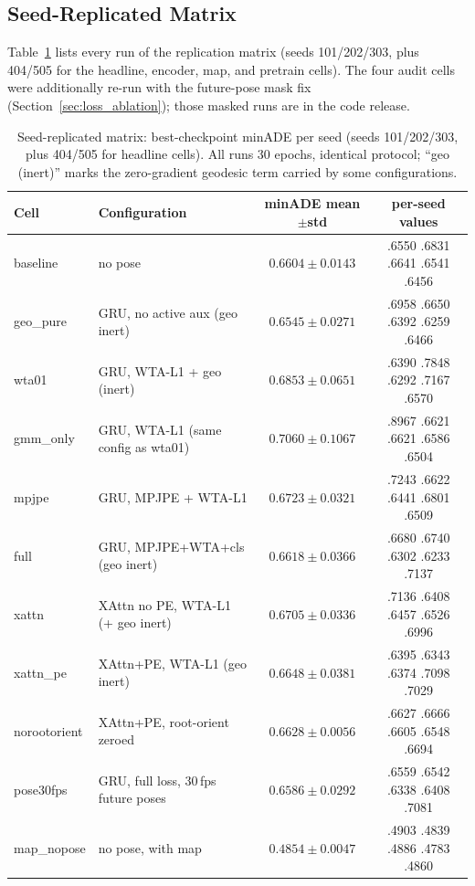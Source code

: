 \documentclass{article} %
\newcommand{\minADE}{minADE\xspace}
\begin{document}
\subsection{Seed-Replicated Matrix}
Table~\ref{tab:multiseed} lists every run of the replication matrix
(seeds 101/202/303, plus 404/505 for the headline, encoder, map, and pretrain
cells). The four audit cells were additionally re-run with the future-pose mask fix
(Section~\ref{sec:loss_ablation}); those masked runs are in the code release.

\begin{table}[h]
\caption{Seed-replicated matrix: best-checkpoint \minADE per seed (seeds
101/202/303, plus 404/505 for headline cells). All runs 30 epochs, identical
protocol; ``geo (inert)'' marks the zero-gradient geodesic term carried by some
configurations.}
\label{tab:multiseed}
\begin{center}
\footnotesize
\setlength{\tabcolsep}{3.5pt}
\begin{tabular}{llcc}
\toprule
Cell & Configuration & \minADE mean$\pm$std & per-seed values \\
\midrule
baseline   & no pose                          & $0.6604 \pm 0.0143$ & .6550 .6831 .6641 .6541 .6456 \\
geo\_pure  & GRU, no active aux (geo inert)   & $0.6545 \pm 0.0271$ & .6958 .6650 .6392 .6259 .6466 \\
wta01      & GRU, WTA-L1 + geo (inert)        & $0.6853 \pm 0.0651$ & .6390 .7848 .6292 .7167 .6570 \\
gmm\_only  & GRU, WTA-L1 (same config as wta01) & $0.7060 \pm 0.1067$ & .8967 .6621 .6621 .6586 .6504 \\
mpjpe      & GRU, MPJPE + WTA-L1              & $0.6723 \pm 0.0321$ & .7243 .6622 .6441 .6801 .6509 \\
full       & GRU, MPJPE+WTA+cls (geo inert) & $0.6618 \pm 0.0366$ & .6680 .6740 .6302 .6233 .7137 \\
xattn      & XAttn no PE, WTA-L1 (+ geo inert) & $0.6705 \pm 0.0336$ & .7136 .6408 .6457 .6526 .6996 \\
xattn\_pe  & XAttn+PE, WTA-L1 (geo inert) & $0.6648 \pm 0.0381$ & .6395 .6343 .6374 .7098 .7029 \\
norootorient & XAttn+PE, root-orient zeroed & $0.6628 \pm 0.0056$ & .6627 .6666 .6605 .6548 .6694 \\
pose30fps & GRU, full loss, 30\,fps future poses & $0.6586 \pm 0.0292$ & .6559 .6542 .6338 .6408 .7081 \\
\midrule
map\_nopose & no pose, with map               & $0.4854 \pm 0.0047$ & .4903 .4839 .4886 .4783 .4860 \\

\end{tabular}
\end{center}
\end{table}
\end{document}
